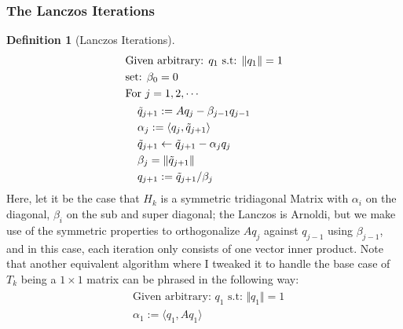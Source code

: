 \documentclass[]{article}
\theoremstyle{definition}
\newtheorem{definition}{Definition}      %
\begin{document}
        \subsubsection{The Lanczos Iterations}
            \begin{definition}[Lanczos Iterations]
                \begin{align}
                    & \text{Given arbitrary: } q_1 \text{ s.t: } \Vert q_1\Vert = 1
                    \\
                    & \text{set: }\beta_0 = 0
                    \\
                    & \text{For } j = 1, 2, \cdots 
                    \\
                    &\hspace{1.1em}\begin{aligned}
                        & \tilde{q}_{j + 1} := Aq_j - \beta_{j - 1}q_{j - 1}
                        \\
                        & \alpha_j := \langle q_j,\tilde{q}_{j + 1}\rangle
                        \\
                        & \tilde{q}_{j + 1} \leftarrow \tilde{q}_{j + 1} - \alpha_j q_j
                        \\
                        & \beta_j = \Vert \tilde{q}_{j + 1}\Vert
                        \\
                        & q_{j + 1} := \tilde{q}_{j + 1}/\beta_j
                    \end{aligned}
                \end{align}
                Here, let it be the case that $H_k$ is a symmetric tridiagonal Matrix with $\alpha_i$ on the diagonal, $\beta_i$ on the sub and super diagonal; the Lanczos is Arnoldi, but we make use of the symmetric properties to orthogonalize $Aq_j$ against $q_{j - 1}$ using $\beta_{j-1}$, and in this case, each iteration only consists of one vector inner product. 
                Note that another equivalent algorithm where I tweaked it to handle the base case of $T_k$ being a $1\times 1 $ matrix can be phrased in the following way: 
                \begin{align}
                    \begin{aligned}
                        & \text{Given arbitrary: }q_1 \text{ s.t: } \Vert q_1\Vert = 1
                        \\
                        & \alpha_1 := \langle q_1, Aq_1\rangle
                        \\

\end{aligned}
\end{align}
\end{definition}
\end{document}
